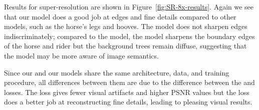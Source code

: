\documentclass[runningheads]{llncs}
\begin{document}
Results for  super-resolution are shown in Figure~\ref{fig:SR-8x-results}. Again we see that
our  model does a good job at edges and fine details compared to other models,
such as the horse's legs and hooves. The  model does not sharpen edges
indiscriminately; compared to the  model, the  model sharpens the boundary
edges of the horse and rider but the background trees remain diffuse, suggesting that the
 model may be more aware of image semantics.

Since our  and our  models share the same architecture,
data, and training procedure, all differences between them are due to the difference between the
 and  losses. The  loss gives fewer visual artifacts and
higher PSNR values but the  loss does a better job at reconstructing fine details, leading
to pleasing visual results.
\end{document}
